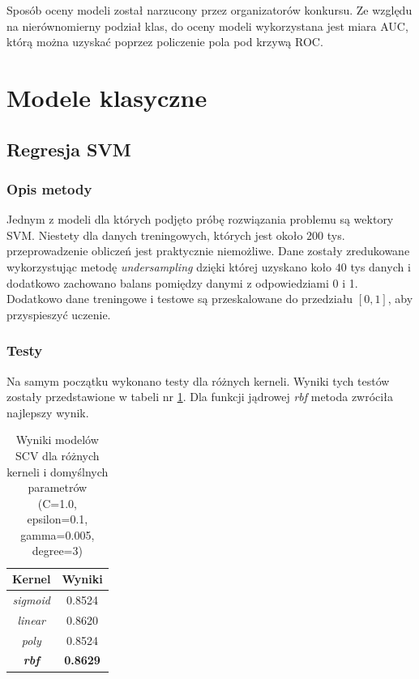 \documentclass[12pt]{article}
\begin{document}
Sposób oceny modeli został narzucony przez organizatorów konkursu. Ze względu na nierównomierny podział klas, do oceny modeli wykorzystana jest miara AUC, którą można uzyskać poprzez policzenie pola pod krzywą ROC.


\section{Modele klasyczne}

\subsection{Regresja SVM}
\subsubsection{Opis metody}
Jednym z modeli dla których podjęto próbę rozwiązania problemu są wektory SVM. Niestety dla danych treningowych, których jest około $200$ tys. przeprowadzenie obliczeń jest praktycznie niemożliwe. Dane zostały zredukowane wykorzystując metodę \textit{undersampling} dzięki której uzyskano koło $40$ tys danych i dodatkowo zachowano balans pomiędzy danymi z odpowiedziami 0 i 1. Dodatkowo dane treningowe i testowe są przeskalowane do przedziału $[0, 1]$, aby przyspieszyć uczenie.

\subsubsection{Testy}
Na samym początku wykonano testy dla różnych kerneli. Wyniki tych testów zostały przedstawione w tabeli nr \ref{tab:svm_kernels}. Dla funkcji jądrowej \textit{rbf} metoda zwróciła najlepszy wynik.
\begin{table}[H]
    \centering
    \begin{tabular}{|c|c|}
    \hline
    Kernel & Wyniki \\
    \hline
    \hline
    \textit{sigmoid} &	0.8524 \\
    \hline
    \textit{linear} &	0.8620 \\
    \hline
    \textit{poly} &	0.8524 \\
    \hline
    \textbf{\textit{rbf}} &	\textbf{0.8629} \\
    \hline
    \end{tabular}
    \caption{Wyniki modelów SCV dla różnych kerneli i domyślnych parametrów (C=1.0, epsilon=0.1, gamma=0.005, degree=3)}
    \label{tab:svm_kernels}
\end{table}
\end{document}
